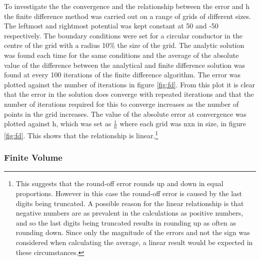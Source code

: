\documentclass[aps,twocolumn,pre,nofootinbib,10pt]{revtex4-1}
\begin{document}
To investigate the the convergence and the relationship between the error and h the finite difference method was carried out on a range of grids of different sizes. The leftmost and rightmost potential was kept constant at 50 and -50 respectively. The boundary conditions were set for a circular conductor in the centre of the grid with a radius 10\% the size of the grid. The analytic solution was found each time for the same conditions and the average of the absolute value of the difference between the analytical and finite difference solution was found at every 100 iterations of the finite difference algorithm. The error was plotted against the number of iterations in figure \ref{fig:fd}. From this plot it is clear that the error in the solution does converge with repeated iterations and that the number of iterations required for this to converge increases as the number of points in the grid increases. 
The value of the absolute error at convergence was plotted against h, which was set as \(\frac{1}{n}\) where each grid was nxn in size, in figure \ref{fig:fd}. This shows that the relationship is linear.\footnote{This suggests that the round-off error rounds up and down in equal proportions. However in this case the round-off error is caused by the last digits being truncated. A possible reason for the linear relationship is that negative numbers are as prevalent in the calculations as positive numbers, and so the last digits being truncated results in rounding up as often as rounding down. Since only the magnitude of the errors and not the sign was considered when calculating the average, a linear result would be expected in these circumstances.}

\subsubsection{Finite Volume}
\end{document}
